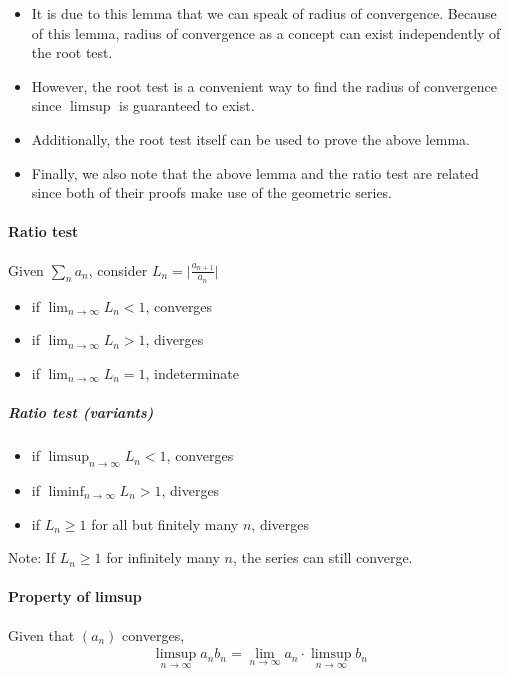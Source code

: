 \documentclass{article}
\begin{document}
\begin{itemize}
\item It is due to this lemma that we can speak of radius of convergence. Because of this lemma, radius of convergence as a concept can exist independently of the root test. 
\item However, the root test is a convenient way to find the radius of convergence since $\limsup$ is guaranteed to exist.
\item Additionally, the root test itself can be used to prove the above lemma.
\item Finally, we also note that the above lemma and the ratio test are related since both of their proofs make use of the geometric series.
\end{itemize}

\paragraph{Ratio test}
Given $\sum_n a_n$, consider $L_n = \lvert \frac{a_{n+1}}{a_n} \rvert$
\begin{itemize}
	\item if $\lim_{n\rightarrow \infty} L_n < 1$, converges
	\item if $\lim_{n\rightarrow \infty} L_n > 1$, diverges
	\item if $\lim_{n\rightarrow \infty} L_n = 1$, indeterminate
\end{itemize}

\subparagraph{Ratio test (variants)}
\begin{itemize}
	\item if $\limsup_{n\rightarrow \infty} L_n < 1$, converges
	\item if $\liminf_{n\rightarrow \infty} L_n > 1$, diverges
	\item if $L_n\geq 1$ for all but finitely many $n$, diverges
\end{itemize}

Note: If $L_n\geq 1$ for infinitely many $n$, the series can still converge.

\paragraph{Property of limsup}
Given that $(a_n)$ converges,
\begin{align*}
	\limsup_{n\rightarrow \infty} a_nb_n = \lim_{n\rightarrow \infty} a_n\cdot \limsup_{n\rightarrow \infty} b_n
\end{align*}
\end{document}
